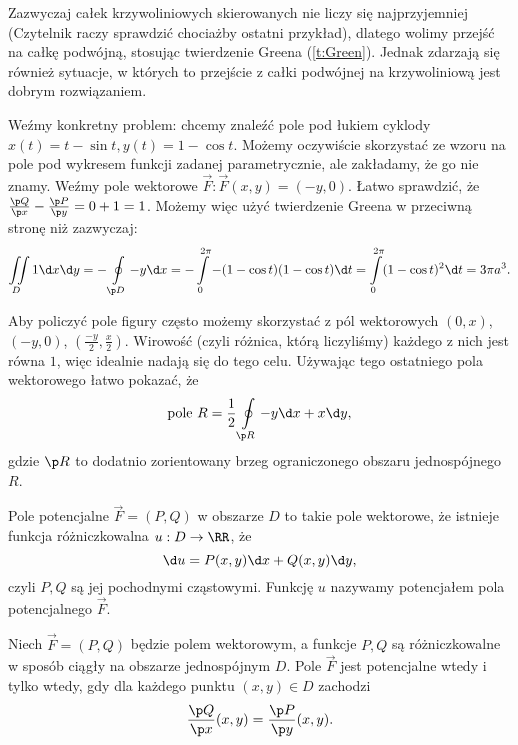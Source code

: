 \begin{remark}
    Zazwyczaj całek krzywoliniowych skierowanych nie liczy się najprzyjemniej (Czytelnik raczy sprawdzić chociażby ostatni przykład), dlatego wolimy przejść na całkę podwójną, stosując twierdzenie Greena (\ref{t:Green}). Jednak zdarzają się również sytuacje, w których to przejście z całki podwójnej na krzywoliniową jest dobrym rozwiązaniem.

    Weźmy konkretny problem: chcemy znaleźć pole pod łukiem cyklody $x(t) = t - \sin t, y(t) = 1 - \cos t$. Możemy oczywiście skorzystać ze wzoru na pole pod wykresem funkcji zadanej parametrycznie, ale zakładamy, że go nie znamy. Weźmy pole wektorowe $\vec{F} : \vec{F}(x, y) = (-y, 0)$. Łatwo sprawdzić, że $\frac{\p Q}{\p x} - \frac{\p P}{\p y} = 0 + 1 = 1$. Możemy więc użyć twierdzenie Greena w przeciwną stronę niż zazwyczaj:
    \[ \iint\limits_D 1 \d x \d y = -\oint\limits_{\p D} -y \d x = -\int\limits_0^{2\pi} -(1 - \cos t)(1 - \cos t) \d t = \int\limits_0^{2\pi} (1 - \cos t)^2 \d t = 3\pi a^3.\]

    Aby policzyć pole figury często możemy skorzystać z pól wektorowych $(0, x)$, $(-y, 0)$, $\left(\frac{-y}{2}, \frac{x}{2}\right)$. Wirowość (czyli różnica, którą liczyliśmy) każdego z nich jest równa $1$, więc idealnie nadają się do tego celu. Używając tego ostatniego pola wektorowego łatwo pokazać, że
    \begin{equation}
        \text{pole } R = \frac{1}{2}\oint\limits_{\p R} -y \d x + x \d y,
    \end{equation}
    gdzie $\p R$ to dodatnio zorientowany brzeg ograniczonego obszaru jednospójnego $R$.
\end{remark}

\begin{definition}
    Pole potencjalne $\vec{F} = (P, Q)$ w obszarze $D$ to takie pole wektorowe, że istnieje funkcja różniczkowalna $u : D \to \RR$, że
    \[ \d u = P(x, y) \d x + Q(x, y) \d y, \]
    czyli $P, Q$ są jej pochodnymi cząstowymi. Funkcję $u$ nazywamy potencjałem pola potencjalnego $\vec{F}$.
\end{definition}

\begin{theorem}
    \label{t:necessary and sufficient condition for field potentiality}
    Niech $\vec{F} = (P, Q)$ będzie polem wektorowym, a funkcje $P, Q$ są różniczkowalne w sposób ciągły na obszarze jednospójnym $D$. Pole $\vec{F}$ jest potencjalne wtedy i tylko wtedy, gdy dla każdego punktu $(x, y) \in D$ zachodzi
    \[ \frac{\p Q}{\p x}(x, y) = \frac{\p P}{\p y}(x, y). \]
\end{theorem}

